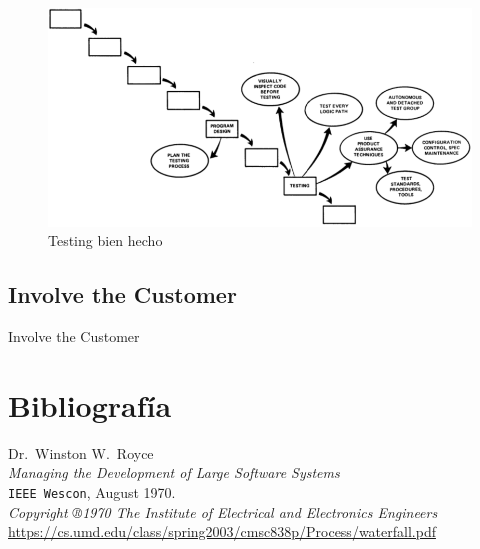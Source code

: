 \documentclass{beamer}
\begin{document}
\begin{frame}
\begin{figure}
\includegraphics[width=.9\textwidth]{figures/testing.png}
\caption{Testing bien hecho}
\end{figure}
\end{frame}

\subsection{Involve the Customer}

\begin{frame}{Involve the Customer}

\end{frame}


\section{Bibliografía}

\begin{frame}[fragile]
\begin{thebibliography}{9}
  \footnotesize
  Dr.\ Winston W.\ Royce \\
  \emph{Managing the Development of Large Software Systems} \\
  \texttt{IEEE Wescon},
  August 1970. \\
  \textit{Copyright ®1970 The Institute of Electrical and Electronics Engineers} \\
  {\scriptsize\url{https://cs.umd.edu/class/spring2003/cmsc838p/Process/waterfall.pdf}}
\end{thebibliography}
\end{frame}
\end{document}
